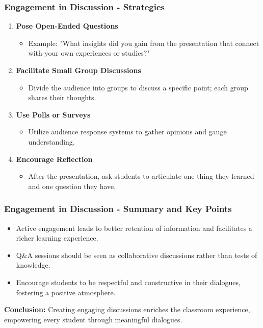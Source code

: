 \documentclass[aspectratio=169]{beamer}
\begin{document}
\begin{frame}[fragile]
    \frametitle{Engagement in Discussion - Strategies}
    \begin{enumerate}
        \item \textbf{Pose Open-Ended Questions}
            \begin{itemize}
                \item Example: "What insights did you gain from the presentation that connect with your own experiences or studies?"
            \end{itemize}
        \item \textbf{Facilitate Small Group Discussions}
            \begin{itemize}
                \item Divide the audience into groups to discuss a specific point; each group shares their thoughts.
            \end{itemize}
        \item \textbf{Use Polls or Surveys}
            \begin{itemize}
                \item Utilize audience response systems to gather opinions and gauge understanding.
            \end{itemize}
        \item \textbf{Encourage Reflection}
            \begin{itemize}
                \item After the presentation, ask students to articulate one thing they learned and one question they have.
            \end{itemize}
    \end{enumerate}
\end{frame}

\begin{frame}[fragile]
    \frametitle{Engagement in Discussion - Summary and Key Points}
    \begin{itemize}
        \item Active engagement leads to better retention of information and facilitates a richer learning experience.
        \item Q\&A sessions should be seen as collaborative discussions rather than tests of knowledge.
        \item Encourage students to be respectful and constructive in their dialogues, fostering a positive atmosphere.
    \end{itemize}
    
    \textbf{Conclusion:} Creating engaging discussions enriches the classroom experience, empowering every student through meaningful dialogues.
\end{frame}
\end{document}
